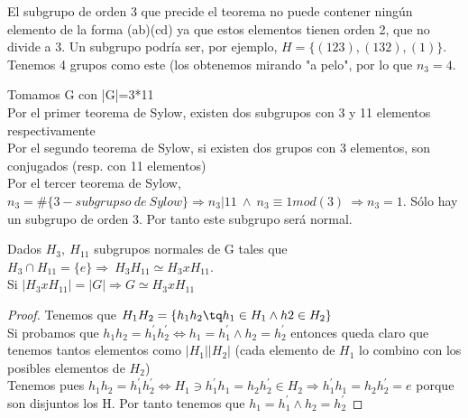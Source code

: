 \documentclass[nochap]{apuntes}
\begin{document}
\begin{example}
 El subgrupo de orden 3 que precide el teorema no puede contener ningún elemento de la forma (ab)(cd) ya que estos elementos tienen
 orden 2, que no divide a 3. Un subgrupo podría ser, por ejemplo, $H=\{(123),(132),(1)\}$.\\
 Tenemos 4 grupos como este (los obtenemos mirando "a pelo", por lo que $n_3=4$.\\
 \end{example}

 \begin{example}
  Tomamos G con |G|=3*11\\
  Por el primer teorema de Sylow, existen dos subgrupos con 3 y 11 elementos respectivamente\\
  Por el segundo teorema de Sylow, si existen dos grupos con 3 elementos, son conjugados (resp. con 11 elementos)\\
  Por el tercer teorema de Sylow, $n_3=\#\{3-subgrupso \ de \ Sylow\} \Rightarrow n_3|11 \ \wedge \ n_3\equiv 1 mod(3) \ \Rightarrow n_3=1$.
  Sólo hay un subgrupo de orden 3. Por tanto este subgrupo será normal.
 \end{example}

 \begin{lemma}
  Dados $H_3, \ H_{11}$  subgrupos normales de G tales que $H_3\cap H_{11} = \{e\} \Rightarrow \ H_3H_{11} \simeq H_3 x H_{11}$.\\
  Si $|H_3xH_{11}|=|G| \Rightarrow G\simeq H_3xH_{11}$
 \end{lemma}
 \begin{proof}
  Tenemos que $H_1H_2=\{h_1h_2\tq h_1\in H_1 \wedge h2\in H_2\}$\\
  Si probamos que $h_1h_2=h_1^{'}h_2^{'} \Leftrightarrow h_1=h_1^{'} \wedge h_2=h_2^{'}$  entonces queda claro que tenemos tantos elementos como
  $|H_1||H_2|$ (cada elemento de $H_1$  lo combino con los posibles elementos de $H_2$)\\
  Tenemos pues $h_1h_2=h_1^{'}h_2^{'} \Leftrightarrow H_1\ni h_1^{'}h_1=h_2h_2^{'} \in H_2 \Rightarrow h_1^{'}h_1=h_2h_2^{'}=e$  porque son 
  disjuntos los H. Por tanto tenemos que $h_1=h_1^{'} \wedge h_2=h_2^{'}$
 \end{proof}
\end{document}
